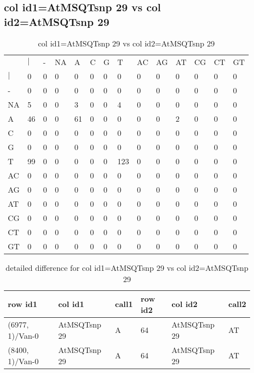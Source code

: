 \subsection{col id1=AtMSQTsnp 29 vs col id2=AtMSQTsnp 29}
\begin{center}
\begin{longtable}{|l|l|l|l|l|l|l|l|l|l|l|l|l|l|}
\caption{col id1=AtMSQTsnp 29 vs col id2=AtMSQTsnp 29} \label{table_dm832}\\
\hline
\\
\hline
&$|$&-&NA&A&C&G&T&AC&AG&AT&CG&CT&GT\\
$|$&0&0&0&0&0&0&0&0&0&0&0&0&0\\
-&0&0&0&0&0&0&0&0&0&0&0&0&0\\
NA&5&0&0&3&0&0&4&0&0&0&0&0&0\\
A&46&0&0&61&0&0&0&0&0&2&0&0&0\\
C&0&0&0&0&0&0&0&0&0&0&0&0&0\\
G&0&0&0&0&0&0&0&0&0&0&0&0&0\\
T&99&0&0&0&0&0&123&0&0&0&0&0&0\\
AC&0&0&0&0&0&0&0&0&0&0&0&0&0\\
AG&0&0&0&0&0&0&0&0&0&0&0&0&0\\
AT&0&0&0&0&0&0&0&0&0&0&0&0&0\\
CG&0&0&0&0&0&0&0&0&0&0&0&0&0\\
CT&0&0&0&0&0&0&0&0&0&0&0&0&0\\
GT&0&0&0&0&0&0&0&0&0&0&0&0&0\\
\hline
\end{longtable}
\end{center}

\begin{center}
\begin{longtable}{|l|l|l|l|l|l|}
\caption{detailed difference for col id1=AtMSQTsnp 29 vs col id2=AtMSQTsnp 29} \label{table_dm833}\\
\hline
row id1&col id1&call1&row id2&col id2&call2\\
\hline
(6977, 1)/Van-0&AtMSQTsnp 29&A&64&AtMSQTsnp 29&AT\\
(8400, 1)/Van-0&AtMSQTsnp 29&A&64&AtMSQTsnp 29&AT\\
\hline
\end{longtable}
\end{center}

